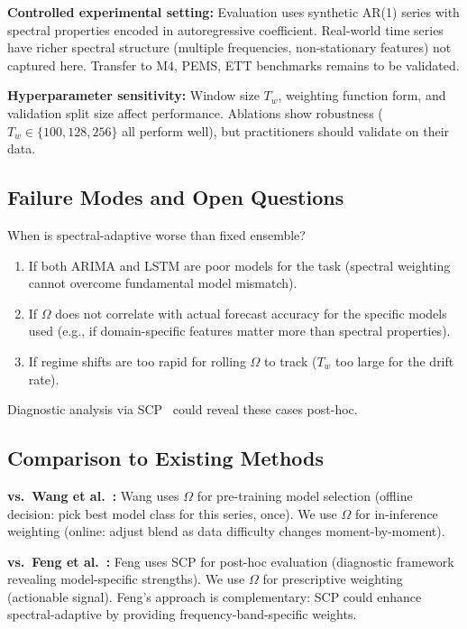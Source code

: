 \documentclass[11pt,letterpaper]{article}
\begin{document}
\textbf{Controlled experimental setting:} Evaluation uses synthetic AR(1) series with spectral properties encoded in autoregressive coefficient. Real-world time series have richer spectral structure (multiple frequencies, non-stationary features) not captured here. Transfer to M4, PEMS, ETT benchmarks remains to be validated.

\textbf{Hyperparameter sensitivity:} Window size $T_w$, weighting function form, and validation split size affect performance. Ablations show robustness ($T_w \in \{100, 128, 256\}$ all perform well), but practitioners should validate on their data.

\subsection{Failure Modes and Open Questions}

When is spectral-adaptive worse than fixed ensemble?
\begin{enumerate}
  \item If both ARIMA and LSTM are poor models for the task (spectral weighting cannot overcome fundamental model mismatch).
  \item If $\Omega$ does not correlate with actual forecast accuracy for the specific models used (e.g., if domain-specific features matter more than spectral properties).
  \item If regime shifts are too rapid for rolling $\Omega$ to track ($T_w$ too large for the drift rate).
\end{enumerate}

Diagnostic analysis via SCP~\cite{Feng2025} could reveal these cases post-hoc.

\subsection{Comparison to Existing Methods}

\textbf{vs.~Wang et al.~\cite{Wang2025}:} Wang uses $\Omega$ for pre-training model selection (offline decision: pick best model class for this series, once). We use $\Omega$ for in-inference weighting (online: adjust blend as data difficulty changes moment-by-moment).

\textbf{vs.~Feng et al.~\cite{Feng2025}:} Feng uses SCP for post-hoc evaluation (diagnostic framework revealing model-specific strengths). We use $\Omega$ for prescriptive weighting (actionable signal). Feng's approach is complementary: SCP could enhance spectral-adaptive by providing frequency-band-specific weights.
\end{document}
